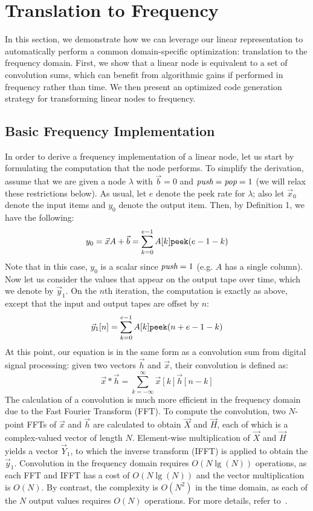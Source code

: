 \section{Translation to Frequency}
\label{sec:freq}

In this section, we demonstrate how we can leverage our linear
representation to automatically perform a common domain-specific
optimization: translation to the frequency domain.  First, we show
that a linear node is equivalent to a set of convolution sums, which
can benefit from algorithmic gains if performed in frequency rather
than time.  We then present an optimized code generation strategy for
transforming linear nodes to frequency.

\subsection{Basic Frequency Implementation}

In order to derive a frequency implementation of a linear node, let us
start by formulating the computation that the node performs.  To
simplify the derivation, assume that we are given a node $\lambda$
with $\vec{b} = 0$ and $\mbox{\it push}=\mbox{\it pop}=1$ (we will relax these
restrictions below).  As usual, let $e$ denote the peek rate for
$\lambda$; also let ${\vec x}_0$ denote the input items and $y_0$
denote the output item.  Then, by Definition 1, we have the following:
\begin{equation}
  y_0 = \vec{x} A + {\vec b} = \sum_{k=0}^{e-1} A[k] \mbox{\tt peek}(e-1-k)
\end{equation}
Note that in this case, $y_0$ is a scalar since $\mbox{\it push}=1$ (e.g. $A$
has a single column).  Now
let us consider the values that appear on the output tape over time,
which we denote by $\vec{y}_1$.  On the $n$th iteration, the
computation is exactly as above, except that the input and output
tapes are offset by $n$:
\begin{equation}
  \protect\label{eq:linconv}
  \vec{y}_1[n] = \sum_{k=0}^{e-1} A[k] \mbox{\tt peek}(n+e-1-k) 
\end{equation}
At this point, our equation is in the same form as a convolution sum
from digital signal processing: given two vectors $\vec{h}$ and
$\vec{x}$, their convolution is defined as:
\begin{equation}
  \vec{x} * \vec{h} = \sum_{k=-\infty}^{\infty} \vec{x}[k] \vec{h}[n-k]
\end{equation}
The calculation of a convolution is much more efficient in the
frequency domain due to the Fast Fourier Transform (FFT).  To compute
the convolution, two $N$-point FFTs of $\vec{x}$ and $\vec{h}$ are
calculated to obtain $\vec{X}$ and $\vec{H}$, each of which is a
complex-valued vector of length $N$.  Element-wise multiplication of
$\vec{X}$ and $\vec{H}$ yields a vector $\vec{Y}_1$, to which the  
inverse transform (IFFT) is applied to obtain the $\vec{y}_1$.
Convolution in the frequency domain requires $O(N \lg(N))$ operations,
as each FFT and IFFT has a cost of $O(N \lg (N))$ and the vector
multiplication is $O(N)$.  By contrast, the complexity is $O(N^2)$ in
the time domain, as each of the $N$ output values requires $O(N)$
operations.  For more details, refer to~\cite{oppenheim-discrete}.

